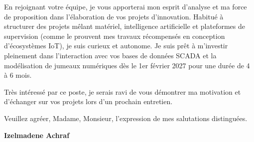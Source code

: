\documentclass[10pt,a4paper]{altacv}
\begin{document}
En rejoignant votre équipe, je vous apporterai mon esprit d’analyse et ma force de proposition dans l’élaboration de vos projets d’innovation. Habitué à structurer des projets mêlant matériel, intelligence artificielle et plateformes de supervision (comme le prouvent mes travaux récompensés en conception d’écosystèmes IoT), je suis curieux et autonome. Je suis prêt à m’investir pleinement dans l’interaction avec vos bases de données SCADA et la modélisation de jumeaux numériques dès le 1er février 2027 pour une durée de 4 à 6 mois.
\vspace{0.4cm}

Très intéressé par ce poste, je serais ravi de vous démontrer ma motivation et d'échanger sur vos projets lors d'un prochain entretien.

\vspace{0.5cm}

Veuillez agréer, Madame, Monsieur, l'expression de mes salutations distinguées.

\vfill

\begin{flushright}
  \Large\color{emphasis}\textbf{Izelmadene Achraf}
\end{flushright}
\end{document}

